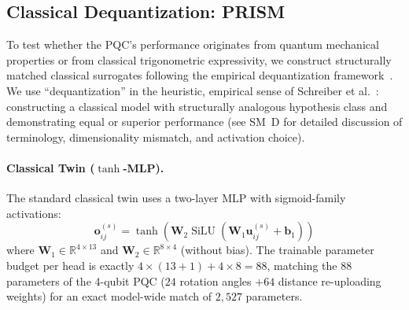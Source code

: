 \documentclass[10pt,twocolumn,letterpaper]{article}
\begin{document}
\subsection{Classical Dequantization: PRISM}
\label{sec:periodic_egnn}


To test whether the PQC's performance originates from quantum mechanical properties or from classical trigonometric expressivity, we construct structurally matched classical surrogates following the empirical dequantization framework~\cite{Tang:2018lmw, Schreiber:2022roq, pegg2026isoqgnn}.
We use ``dequantization'' in the heuristic, empirical sense of Schreiber et al.~\cite{Schreiber:2022roq}: constructing a classical model with structurally analogous hypothesis class and demonstrating equal or superior performance (see SM~D for detailed discussion of terminology, dimensionality mismatch, and activation choice).

\paragraph{Classical Twin ($\tanh$-MLP).}
The standard classical twin uses a two-layer MLP with sigmoid-family activations:
\begin{equation}
    \mathbf{o}_{ij}^{(s)} = \tanh\left(\mathbf{W}_2 \operatorname{SiLU}(\mathbf{W}_1 \mathbf{u}_{ij}^{(s)} + \mathbf{b}_1)\right)
\end{equation}
where $\mathbf{W}_1 \in \mathbb{R}^{4 \times 13}$ and $\mathbf{W}_2 \in \mathbb{R}^{8 \times 4}$ (without bias). The trainable parameter budget per head is exactly $4 \times (13 + 1) + 4 \times 8 = 88$, matching the 88 parameters of the 4-qubit PQC ($24$ rotation angles $+ 64$ distance re-uploading weights) for an exact model-wide match of $2{,}527$ parameters.
\end{document}
